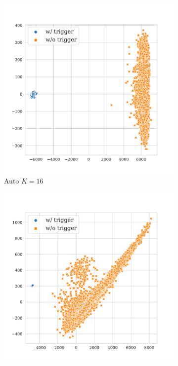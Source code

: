 \begin{figure}[!ht]
\begin{subfigure}{.33\textwidth}
  \centering
  \includegraphics[width=\linewidth]{figures/evaluation_media/sst2-roberta-large-visual-backdoor-auto-k16-seed42-candidates10-poison-cf-1114.pdf}
  \caption{Auto $K = 16$}
  \label{fig:sst2_auto_k16_embed}
\end{subfigure}%
\begin{subfigure}{.33\textwidth}
  \centering
  \includegraphics[width=\linewidth]{figures/evaluation_media/sst2-roberta-large-visual-backdoor-auto-k100-seed42-candidates10-poison-cf-1114.pdf}

\end{subfigure}
\end{figure}
